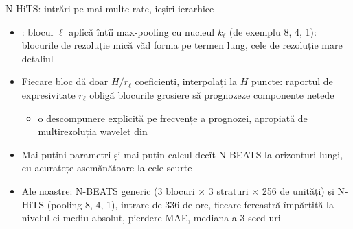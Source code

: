 \begin{frame}{N-HiTS: intrări pe mai multe rate, ieșiri ierarhice}
\itemsize{\small}
\begin{itemize}
    \item {}: blocul $\ell$ aplică întîi max-pooling cu nucleul $k_\ell$ (de exemplu 8, 4, 1): blocurile de rezoluție mică văd forma pe termen lung, cele de rezoluție mare detaliul
    \item Fiecare bloc dă doar $H/r_\ell$ coeficienți, interpolați la $H$ puncte: raportul de expresivitate $r_\ell$ obligă blocurile grosiere să prognozeze componente netede
    \begin{itemize}
        \item o descompunere explicită pe frecvențe a prognozei, apropiată de multirezoluția wavelet din 
    \end{itemize}
    \item Mai puțini parametri și mai puțin calcul decît N-BEATS la orizonturi lungi, cu acuratețe asemănătoare la cele scurte
    \item Ale noastre: N-BEATS generic (3 blocuri $\times$ 3 straturi $\times$ 256 de unități) și N-HiTS (pooling 8, 4, 1), intrare de 336 de ore, fiecare fereastră împărțită la nivelul ei mediu absolut, pierdere MAE, mediana a 3 seed-uri
\end{itemize}
\end{frame}

